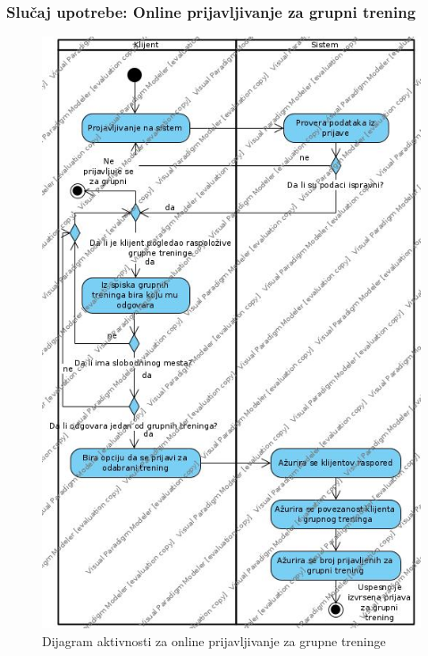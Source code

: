 \documentclass[../main.tex]{subfiles}
\begin{document}
\subsubsection{Slučaj upotrebe: Online prijavljivanje za grupni trening}


\begin{figure}[!ht]
\begin{center}
\includegraphics[scale=0.55]{sections/images/dijagram_aktivnosti_grupni_online_prijavljivanje.jpg}
\end{center}
\caption{Dijagram aktivnosti za online prijavljivanje za grupne treninge}
\label{fig:kontekst}
\end{figure}
\end{document}
